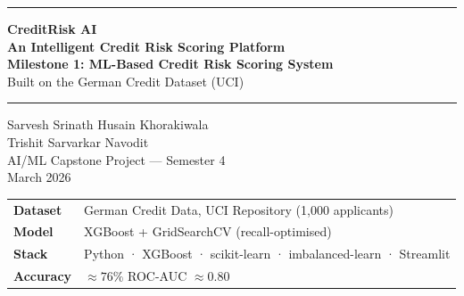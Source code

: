 \documentclass[12pt,a4paper]{article}
\theoremstyle{definition}
\begin{document}
\begin{titlepage}
  \centering
  \vspace*{2cm}

  {\color{primary}\rule{\linewidth}{2pt}}
  \vspace{0.6cm}

  {\Huge\bfseries CreditRisk AI}\\[0.4cm]
  {\Large\bfseries An Intelligent Credit Risk Scoring Platform}\\[0.3cm]
  {\large\bfseries\color{primary} Milestone 1: ML-Based Credit Risk Scoring System}\\[0.25cm]
  {\large\color{muted} Built on the German Credit Dataset (UCI)}

  \vspace{0.6cm}
  {\color{primary}\rule{\linewidth}{1pt}}

  \vspace{1.2cm}

  \vspace{1.5cm}
  {\large Sarvesh Srinath \quad Husain Khorakiwala}\\[0.15cm]
  {\large Trishit Sarvarkar \quad Navodit}\\[0.2cm]
  {\normalsize AI/ML Capstone Project — Semester 4}\\[0.2cm]
  {\normalsize\color{muted} March 2026}

  \vfill

  \begin{tabular}{ll}
    \textbf{Dataset}  & German Credit Data, UCI Repository (1{,}000 applicants) \\
    \textbf{Model}    & XGBoost + GridSearchCV (recall-optimised)               \\
    \textbf{Stack}    & Python · XGBoost · scikit-learn · imbalanced-learn · Streamlit \\
    \textbf{Accuracy} & $\approx 76\%$ \quad ROC-AUC $\approx 0.80$             \\
  \end{tabular}
\end{titlepage}

\tableofcontents
\newpage
\end{document}
